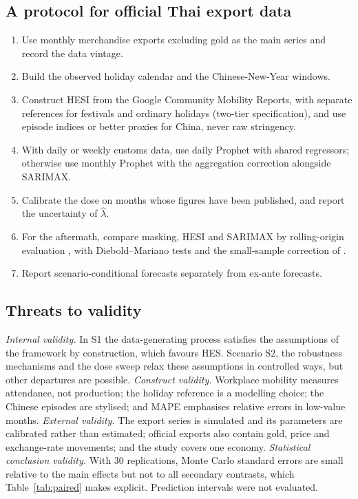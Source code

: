 \documentclass{article}
\theoremstyle{plain}
\theoremstyle{definition}
\theoremstyle{remark}
\begin{document}
\subsection{A protocol for official Thai export data}\label{sec:protocol}
\begin{enumerate}
\item Use monthly merchandise exports excluding gold as the main series and record the data vintage.
\item Build the observed holiday calendar and the Chinese-New-Year windows.
\item Construct HESI from the Google Community Mobility Reports, with separate references for festivals and ordinary holidays (two-tier specification), and use episode indices or better proxies for China, never raw stringency.
\item With daily or weekly customs data, use daily Prophet with shared regressors; otherwise use monthly Prophet with the aggregation correction alongside SARIMAX.
\item Calibrate the dose on months whose figures have been published, and report the uncertainty of $\hat\lambda$.
\item For the aftermath, compare masking, HESI and SARIMAX by rolling-origin evaluation \citep{tashman2000out}, with Diebold--Mariano tests and the small-sample correction of \citet{harvey1997testing}.
\item Report scenario-conditional forecasts separately from ex-ante forecasts.
\end{enumerate}

\subsection{Threats to validity}
\emph{Internal validity.} In S1 the data-generating process satisfies the assumptions of the framework by construction, which favours HES. Scenario S2, the robustness mechanisms and the dose sweep relax these assumptions in controlled ways, but other departures are possible. \emph{Construct validity.} Workplace mobility measures attendance, not production; the holiday reference is a modelling choice; the Chinese episodes are stylised; and MAPE emphasises relative errors in low-value months. \emph{External validity.} The export series is simulated and its parameters are calibrated rather than estimated; official exports also contain gold, price and exchange-rate movements; and the study covers one economy. \emph{Statistical conclusion validity.} With 30 replications, Monte Carlo standard errors are small relative to the main effects but not to all secondary contrasts, which Table~\ref{tab:paired} makes explicit. Prediction intervals were not evaluated.
\end{document}

